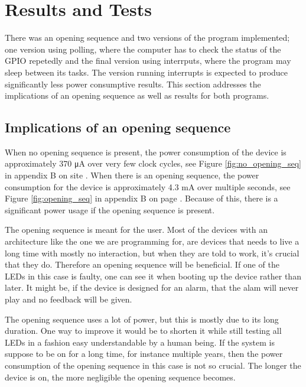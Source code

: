 \section{Results and Tests}

There was an opening sequence and two versions of the program implemented; one version using polling, where the computer has to check the status of the GPIO repetedly and the final version using interrputs, where the program may sleep between its tasks. The version running interrupts is expected to produce significantly less power consumptive results. This section addresses the implications of an opening sequence as well as results for both programs.

\subsection{Implications of an opening sequence}

When no opening sequence is present, the power consumption of the device is approximately 370 \si{\micro\ampere} over very few clock cycles, see Figure \ref{fig:no_opening_seq} in appendix B on site \pageref{fig:no_opening_seq}. When there is an opening sequence, the power consumption for the device is approximately 4.3 \si{\milli\ampere} over multiple seconds, see Figure \ref{fig:opening_seq} in appendix B on page \pageref{fig:opening_seq}. Because of this, there is a significant power usage if the opening sequence is present.

The opening sequence is meant for the user. Most of the devices with an architecture like the one we are programming for, are devices that needs to live a long time with mostly no interaction, but when they are told to work, it's crucial that they do. Therefore an opening sequence will be beneficial. If one of the LEDs in this case is faulty, one can see it when booting up the device rather than later. It might be, if the device is designed for an alarm, that the alam will never play and no feedback will be given.

The opening sequence uses a lot of power, but this is mostly due to its long duration. One way to improve it would be to shorten it while still testing all LEDs in a fashion easy understandable by a human being. If the system is suppose to be on for a long time, for instance multiple years, then the power consumption of the opening sequence in this case is not so crucial. The longer the device is on, the more negligible the opening sequence becomes.

